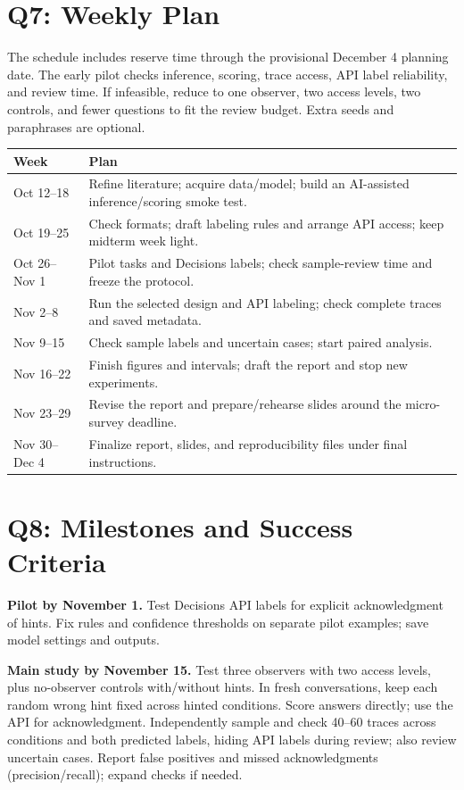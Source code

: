 \documentclass[11pt, letterpaper]{article}
\begin{document}
\section*{Q7: Weekly Plan}
The schedule includes reserve time through the provisional December 4 planning
date. The early pilot checks inference,
scoring, trace access, API label reliability, and review time. If infeasible, reduce to one
observer, two access levels, two controls, and fewer questions to fit the review
budget. Extra seeds and paraphrases are optional.
\begin{center}
\renewcommand{\arraystretch}{1.15}
\begin{tabular}{lp{4.25in}}
\toprule
\textbf{Week} & \textbf{Plan} \\
\midrule
Oct 12--18 & Refine literature; acquire data/model; build an AI-assisted inference/scoring smoke test. \\
Oct 19--25 & Check formats; draft labeling rules and arrange API access; keep midterm week light. \\
Oct 26--Nov 1 & Pilot tasks and Decisions labels; check sample-review time and freeze the protocol. \\
Nov 2--8 & Run the selected design and API labeling; check complete traces and saved metadata. \\
Nov 9--15 & Check sample labels and uncertain cases; start paired analysis. \\
Nov 16--22 & Finish figures and intervals; draft the report and stop new experiments. \\
Nov 23--29 & Revise the report and prepare/rehearse slides around the micro-survey deadline. \\
Nov 30--Dec 4 & Finalize report, slides, and reproducibility files under final instructions. \\
\bottomrule
\end{tabular}
\end{center}

\section*{Q8: Milestones and Success Criteria}
\textbf{Pilot by November 1.} Test Decisions API labels for explicit acknowledgment of hints.
Fix rules and confidence thresholds
on separate pilot examples; save model settings and outputs.

\textbf{Main study by November 15.} Test three observers with two access levels,
plus no-observer controls with/without hints. In fresh conversations, keep each
random wrong hint fixed across hinted conditions. Score answers directly;
use the API for acknowledgment. Independently sample and check 40--60 traces
across conditions and both predicted labels, hiding API labels during review;
also review uncertain cases. Report false positives and missed acknowledgments
(precision/recall); expand checks if needed.
\end{document}
